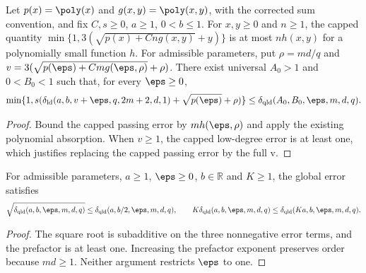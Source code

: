 \begin{theorem}
\label{thm:qld-direct-passing-error-bound}
\leanok
Let $p(x)=\poly(x)$ and $g(x,y)=\poly(x,y)$, with the corrected sum
convention, and fix $C,s\geq0$, $a\geq1$, $0<b\leq1$.
For $x,y\geq0$ and $n\geq1$, the capped quantity
$\min\{1,3(\sqrt{p(x)+Cn g(x,y)}+y)\}$ is at most $n h(x,y)$ for a
polynomially small function $h$. For admissible parameters, put
$\rho=md/q$ and $v=3(\sqrt{p(\eps)+Cm g(\eps,\rho)}+\rho)$.
There exist universal $A_0>1$ and $0<B_0<1$ such that, for every $\eps\geq0$,
\[
 \min\{1,s(\delta_{\rm ld}(a,b,v+\eps,q,2m+2,d,1)
     +\sqrt{p(\eps)}+\rho)\}
 \leq\delta_{\rm qld}(A_0,B_0,\eps,m,d,q).
\]
\end{theorem}
\begin{proof}
\leanok
{}
Bound the capped passing error by $m h(\eps,\rho)$ and apply the existing
polynomial absorption. When $v\geq1$, the capped low-degree error is at
least one, which justifies replacing the capped passing error by the full v.
\end{proof}

\begin{theorem}
\label{thm:pauli-error-square-root-support}
\leanok
For admissible parameters, $a\geq1$, $\eps\geq0$, $b\in\mathbb R$ and
$K\geq1$, the global error satisfies
\[
 \sqrt{\delta_{\rm qld}(a,b,\eps,m,d,q)}
 \leq\delta_{\rm qld}(a,b/2,\eps,m,d,q),\qquad
 K\delta_{\rm qld}(a,b,\eps,m,d,q)
 \leq\delta_{\rm qld}(Ka,b,\eps,m,d,q).
\]
\end{theorem}
\begin{proof}
\leanok
The square root is subadditive on the three nonnegative error terms,
and the prefactor is at least one. Increasing the prefactor exponent
preserves order because $md\geq1$. Neither argument restricts $\eps$ to one.
\end{proof}

